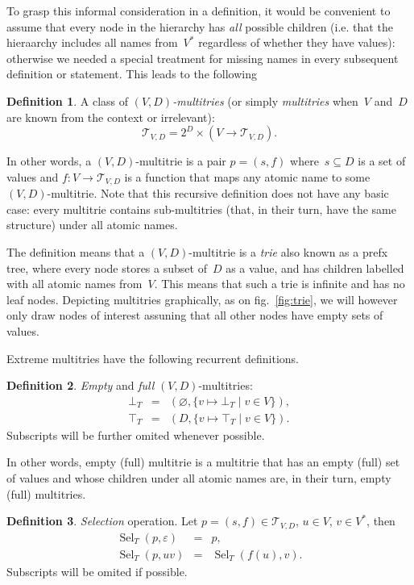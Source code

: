 \documentclass{article}
\theoremstyle{definition}
\newtheorem{Df}{Definition}
\newcommand{\setcharmt}{T}
\newcommand{\setsymbol}[3]{\mathcal{#1}_{#2,#3}}
\newcommand{\setmt}[2]{\setsymbol{\setcharmt}{#1}{#2}}
\newcommand{\select}{\operatorname{Sel}}
\begin{document}
To grasp this informal consideration in a definition, it would be convenient to
assume that every node in the hierarchy has \emph{all} possible children (i.e.
that the hieraarchy includes all names from~$V^\ast$ regardless of whether they
have values): otherwise we needed a special treatment for missing names in
every subsequent definition or statement. This leads to the following

\begin{Df}\label{df:mt}
A class of \emph{$(V,D)$-multitries} (or simply \emph{multitries} when~$V$
and~$D$ are known from the context or irrelevant):
\[
  \setmt{V}{D} = 2^D \times (V \to \setmt{V}{D}) .
\]
\end{Df}

In other words, a $(V,D)$-multitrie is a pair $p = (s, f)$ where~$s\subseteq D$
is a set of values and $f: V \to \setmt{V}{D}$ is a function that maps any
atomic name to some $(V,D)$-multitrie. Note that this recursive definition does
not have any basic case: every multitrie contains sub-multitries (that, in
their turn, have the same structure) under all atomic names.

The definition means that a $(V,D)$-multitrie is a \emph{trie} also known as
a prefx tree, where every node stores a subset of~$D$ as a value, and has
children labelled with all atomic names from~$V$. This means that such a trie
is infinite and has no leaf nodes.
Depicting multitries graphically, as on fig.~\ref{fig:trie}, we will however
only draw nodes of interest assuning that all other nodes have empty sets of
values.

Extreme multitries have the following recurrent definitions.
\begin{Df}\label{df:mt-extreme}
\emph{Empty} and \emph{full} $(V,D)$-multitries:
\begin{eqnarray*}
  \bot_\setcharmt & = &
      ( \varnothing, \{ v \mapsto \bot_\setcharmt \mid v\in V \} ) , \\
  \top_\setcharmt & = &
      ( D,           \{ v \mapsto \top_\setcharmt \mid v\in V \} ) .
\end{eqnarray*}
Subscripts will be further omited whenever possible.
\end{Df}
In other words, empty (full) multitrie is a multitrie that has an empty
(full) set of values and whose children under all atomic names are, in their
turn, empty (full) multitries.

\begin{Df}\label{df:mt-select}
\emph{Selection} operation. Let $p=(s,f) \in \setmt{V}{D}$, $u\in V$,
$v\in V^\ast$, then
\begin{eqnarray*}
  \select_\setcharmt(p, \varepsilon) & = & p , \\
  \select_\setcharmt(p, u v) & = & \select_\setcharmt(f(u), v) .
\end{eqnarray*}
Subscripts will be omited if possible.
\end{Df}
\end{document}
